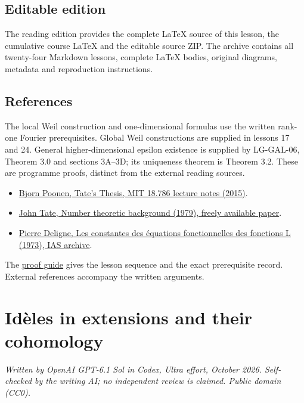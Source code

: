 \documentclass[11pt,a4paper]{article}
\newcommand{\tightlist}{\setlength{\itemsep}{0pt}\setlength{\parskip}{0pt}}
\begin{document}
\subsection{Editable edition}\label{editable-edition}

The reading edition provides the complete LaTeX source of this lesson,
the cumulative course LaTeX and the editable source ZIP. The archive
contains all twenty-four Markdown lessons, complete LaTeX bodies,
original diagrams, metadata and reproduction instructions.

\subsection{References}\label{references}

The local Weil construction and one-dimensional formulas use the written
rank-one Fourier prerequisites. Global Weil constructions are supplied
in lessons 17 and 24. General higher-dimensional epsilon existence is supplied by LG-GAL-06, Theorem 3.0 and sections 3A–3D; its uniqueness theorem is Theorem 3.2. These are programme proofs, distinct from the external reading sources.

\begin{itemize}
\tightlist
\item
  \href{https://math.mit.edu/~poonen/786/notes.pdf}{Bjorn Poonen, Tate's
  Thesis, MIT 18.786 lecture notes (2015)}.
\item
  \href{https://ncatlab.org/nlab/files/TateNumberTheory.pdf}{John Tate,
  Number theoretic background (1979), freely available paper}.
\item
  \href{https://publications.ias.edu/sites/default/files/Number20.pdf}{Pierre
  Deligne, Les constantes des équations fonctionnelles des fonctions L
  (1973), IAS archive}.
\end{itemize}

The \href{../free-proofs.html}{proof guide} gives the lesson sequence
and the exact prerequisite record. External references accompany the
written arguments.

\clearpage
\section{Idèles in extensions and their
cohomology}\label{iduxe8les-in-extensions-and-their-cohomology}

\emph{Written by OpenAI GPT-6.1 Sol in Codex, Ultra effort, October
2026. Self-checked by the writing AI; no independent review is claimed.
Public domain (CC0).}
\end{document}
